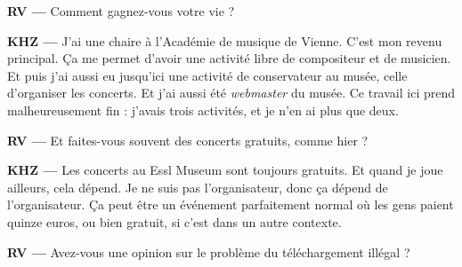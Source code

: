 \documentclass[a4paper,12pt]{article}
\begin{document}
\textbf{RV ---} Comment gagnez-vous votre vie ?

\textbf{KHZ ---} J'ai une chaire à l'Académie de musique de Vienne. C'est mon revenu principal. Ça me permet d'avoir une activité libre de compositeur et de musicien. Et puis j'ai aussi eu jusqu'ici une activité de conservateur au musée, celle d'organiser les concerts. Et j'ai aussi été \emph{webmaster} du musée. Ce travail ici prend malheureusement fin : j'avais trois activités, et je n'en ai plus que deux.

\textbf{RV ---} Et faites-vous souvent des concerts gratuits, comme hier ?

\textbf{KHZ ---} Les concerts au Essl Museum sont toujours gratuits. Et quand je joue ailleurs, cela dépend. Je ne suis pas l'organisateur, donc ça dépend de l'organisateur. Ça peut être un événement parfaitement normal où les gens paient quinze euros, ou bien gratuit, si c'est dans un autre contexte.

\textbf{RV ---} Avez-vous une opinion sur le problème du téléchargement illégal ?
\end{document}
